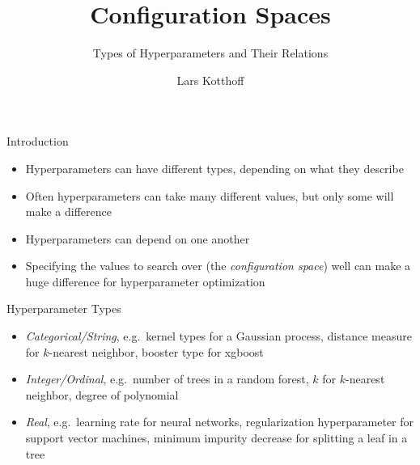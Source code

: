 \documentclass[main]{subfiles}
\begin{document}
\title[AutoML: HPO]{Configuration Spaces}
\subtitle{Types of Hyperparameters and Their Relations}
\author[Lars Kotthoff]{Lars Kotthoff}
\date{}



	\maketitle
	

\begin{frame}{Introduction}
    \begin{itemize}
        \item Hyperparameters can have different types, depending on what they describe
        \item Often hyperparameters can take many different values, but only some will make a difference
        \item Hyperparameters can depend on one another
        \item Specifying the values to search over (the \emph{configuration space}) well can make a huge difference for hyperparameter optimization
    \end{itemize}
\end{frame}


\begin{frame}{Hyperparameter Types}
    \begin{itemize}
        \item \emph{Categorical/String}, e.g.\ kernel types for a Gaussian process, distance measure for $k$-nearest neighbor, booster type for xgboost
        \item \emph{Integer/Ordinal}, e.g.\ number of trees in a random forest, $k$ for $k$-nearest neighbor, degree of polynomial
        \item \emph{Real}, e.g.\ learning rate for neural networks, regularization hyperparameter for support vector machines, minimum impurity decrease for splitting a leaf in a tree
    \end{itemize}
\end{frame}

\end{document}
